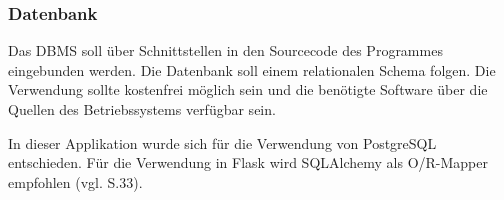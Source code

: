 \subsubsection{Datenbank}

Das DBMS soll über Schnittstellen in den Sourcecode des Programmes eingebunden werden. Die Datenbank soll einem relationalen Schema folgen. Die Verwendung sollte kostenfrei möglich sein und die benötigte Software über die Quellen des Betriebssystems verfügbar sein.

In dieser Applikation wurde sich für die Verwendung von PostgreSQL entschieden. Für die Verwendung in Flask wird SQLAlchemy als O/R-Mapper  empfohlen (vgl. \cite{openingtheflask} S.33).


